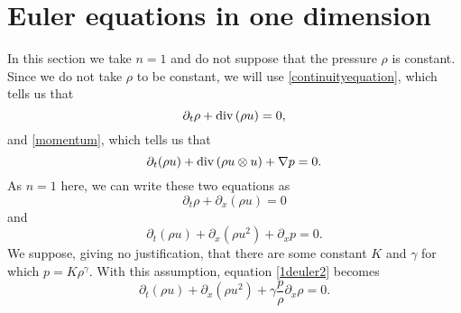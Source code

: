 \documentclass{article}
\renewcommand{\div}{\ensuremath\mathrm{div}\,}
\theoremstyle{definition}
\begin{document}
\section{Euler equations in one dimension}
In this section we take $n=1$ and do not suppose that the pressure $\rho$ is constant. Since we do not take $\rho$ to be constant, we will use \eqref{continuityequation},
which tells us that
\[
\partial_t \rho + \div(\rho u) = 0,
\]
and \eqref{momentum}, which tells us that
\[
\partial_t(\rho u) + \div(\rho u \otimes u) + \nabla p=0.
\]
As $n=1$ here, we can write these two equations as
\begin{equation}
\partial_t \rho+ \partial_x(\rho u)=0
\label{1deuler1}
\end{equation}
and
\begin{equation}
\partial_t (\rho u)+\partial_x(\rho u^2) + \partial_x p =0.
\label{1deuler2}
\end{equation}
We suppose, giving no justification, that there are some constant $K$  and $\gamma$ for which $p=K\rho^\gamma$.
With this assumption, equation \eqref{1deuler2} becomes
\begin{equation}
\partial_t (\rho u)+\partial_x(\rho u^2) + \gamma  \frac{p}{\rho} \partial_x \rho = 0.
\label{pressuredensity}
\end{equation}
\end{document}
